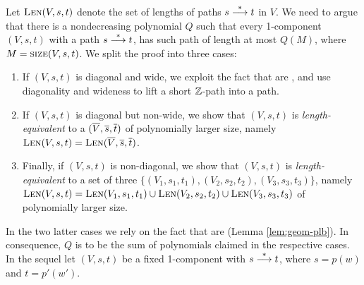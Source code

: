 Let $\textsc{Len}(V, s, t)$ denote the set of lengths of paths $s\stackrel{*}{\longrightarrow} t$ in $V$.
We need to
argue that there is a nondecreasing polynomial $Q$ 
such that every 1-component \tvass $(V, s, t)$
with a path $s\stackrel{*}{\longrightarrow} t$, has such path of length at most $Q(M)$, where 
$M=\textsc{size}(V, s,t)$.
We split the proof into three cases:
\smallskip
\begin{enumerate}
\item
If $(V,s,t)$ is diagonal and wide, we exploit the fact that \tzvass are \plb, and use diagonality and wideness to
lift a short $\mathbb{Z}$-path into a path.
\item
If $(V,s,t)$ is diagonal but non-wide, we show that $(V,s,t)$ is \emph{length-equivalent} to a 
\geomvass $(\overline{V}, \overline{s}, \overline{t})$ of polynomially larger size, namely 
$\textsc{Len}(V, s, t) = \textsc{Len}(\overline{V}, \overline{s}, \overline{t})$.
\item
Finally, if $(V, s, t)$ is non-diagonal, we show that $(V,s,t)$ is \emph{length-equivalent} to a set
of three
\geomvass $\{(V_1, s_1, t_1), (V_2, s_2, t_2), (V_3, s_3, t_3)\}$, namely 
$\textsc{Len}(V, s, t) = \textsc{Len}(V_1, s_1, t_1) \cup \textsc{Len}(V_2, s_2, t_2) \cup \textsc{Len}(V_3, s_3, t_3)$
of polynomially larger size.
\end{enumerate}
\smallskip
\noindent
In the two latter cases we rely on the fact that \geomvass are \plb (Lemma \ref{lem:geom-plb}).
%
%
%
%
%
In consequence, $Q$ is to be the sum of polynomials claimed in the respective cases.
%
In the sequel let $(V, s, t)$ be a fixed 1-component \tvass  with $s\stackrel{*}{\longrightarrow} t$, where
$s=p(w)$ and $t=p'(w')$.

